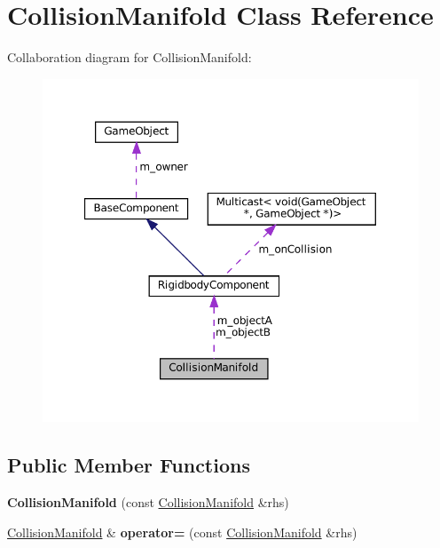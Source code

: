 \hypertarget{classCollisionManifold}{}\section{Collision\+Manifold Class Reference}
\label{classCollisionManifold}


Collaboration diagram for Collision\+Manifold\+:
\nopagebreak
\begin{figure}[H]
\begin{center}
\leavevmode
\includegraphics[width=350pt]{classCollisionManifold__coll__graph}
\end{center}
\end{figure}
\subsection*{Public Member Functions}
\begin{DoxyCompactItemize}
\item 
\mbox{\label{classCollisionManifold_a46e84805aa00f1773719d79f2308deae}} 
{\bfseries Collision\+Manifold} (const \hyperlink{classCollisionManifold}{Collision\+Manifold} \&rhs)
\item 
\mbox{\label{classCollisionManifold_aa037e82ecbe29d22f28427eeef01676b}} 
\hyperlink{classCollisionManifold}{Collision\+Manifold} \& {\bfseries operator=} (const \hyperlink{classCollisionManifold}{Collision\+Manifold} \&rhs)
\end{DoxyCompactItemize}
